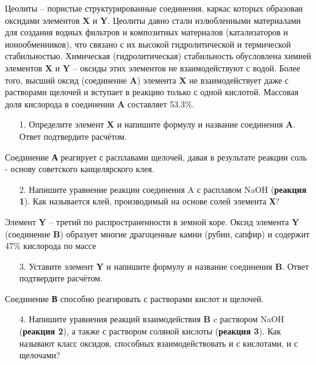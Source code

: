 Цеолиты – пористые структурированные соединения, каркас которых образован оксидами элементов \textbf{X} и \textbf{Y}. Цеолиты давно стали излюбленными материалами для создания водных фильтров и композитных материалов (катализаторов и ионообменников), что связано с их высокой гидролитической и термической стабильностью. Химическая (гидролитическая) стабильность обусловлена химией элементов \textbf{X} и \textbf{Y} – оксиды этих элементов не взаимодействуют с водой. Более того, высший оксид (соединение \textbf{A}) элемента \textbf{X} не взаимодействует даже с растворами щелочей и вступает в реакцию только с одной кислотой. Массовая доля кислорода в соединении \textbf{A} составляет 53.3\%.
\begin{enumerate}
\item[1.] Определите элемент \textbf{X} и напишите формулу и название соединения \textbf{A}. Ответ подтвердите расчётом.
\end{enumerate}
Соединение \textbf{А} реагирует с расплавами щелочей, давая в результате реакции соль - основу советского канцелярского клея.
\begin{enumerate}
\item[2.] Напишите уравнение реакции соединения A с расплавом NaOH (\textbf{реакция 1}). Как называется клей, производимый на основе солей элемента \textbf{Х}? 
\end{enumerate}
Элемент \textbf{Y} – третий по распространенности в земной коре. Оксид элемента \textbf{Y} (соединение \textbf{B}) образует многие драгоценные камни (рубин, сапфир) и содержит 47\% кислорода по массе
\begin{enumerate}
\item[3.] Уставите элемент \textbf{Y} и напишите формулу и название соединения \textbf{B}. Ответ подтвердите расчётом.
\end{enumerate}
Соединение \textbf{В} способно реагировать с растворами кислот и щелочей.
\begin{enumerate}
\item[4.] Напишите уравнения реакций взаимодействия \textbf{B} c раствором NaOH (\textbf{реакция 2}), а также с раствором соляной кислоты (\textbf{реакция 3}). Как называют класс оксидов, способных взаимодействовать и с кислотами, и с щелочами?
\end{enumerate}

